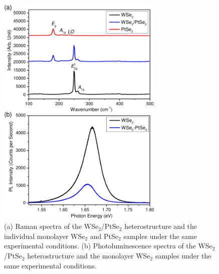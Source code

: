 \documentclass[10pt]{iopart}
\begin{document}
\begin{figure}[ht!]
  \centering
  \includegraphics[width=8cm]{pl.pdf}
  \caption{(a) Raman spectra of the WSe$_2$/PtSe$_2$ heterostructure and the individual monolayer WSe$_2$ and PtSe$_2$ samples under the same experimental conditions. (b) Photoluminescence spectra of the WSe$_2$/PtSe$_2$ heterostructure and the monolayer WSe$_2$ samples under the same experimental conditions.}
    \label{fig:pl}
\end{figure}
\end{document}
